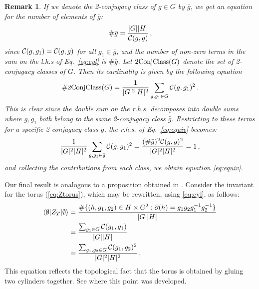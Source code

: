 \documentclass[a4paper,11pt]{article}
\newtheorem{Remark}[Theorem]{Remark}
\begin{document}
\begin{Remark}
If we denote the 2-conjugacy class of $g \in G$ by $\bar g$, we get an equation for the number of elements of $\bar g$:
\begin{equation}
\# \bar{g} = \frac{|G| |H|}{{\cal C}(g,g)} \,,
\end{equation}
since ${\cal C}(g,g_1) = {\cal C}(g,g)$ for all $g_1 \in \bar{g}$, and the number of non-zero terms in the sum on the l.h.s of Eq.~\eqref{eq:cyl} is $\# \bar{g}$.
Let ${\rm 2ConjClass}(G)$ denote the set of 2-conjugacy classes of $G$. Then its cardinality is given by the following equation
\begin{equation}
\label{eq:equiv}
\#{\rm 2ConjClass}(G) = \frac{1}{|G|^2 |H|^2} \sum_{g,g_1 \in G} {\cal C}(g,g_1)^2\,.
\end{equation} 
This is clear since the double sum on the r.h.s. decomposes into double sums where $g,g_1$ both belong to the same 2-conjugacy class $\bar g$. Restricting to these terms for a specific 2-conjugacy class 
$\bar g$, the r.h.s. of Eq.~\eqref{eq:equiv} becomes:
\begin{equation}
\frac{1}{|G|^2 |H|^2}  \sum_{g,g_1 \in \bar g} {\cal C}(g,g_1)^2 = \frac{(\# \bar{g})^2 {\cal C}(g,g)^2}{|G|^2 |H|^2} = 1 \,,
\end{equation}
and collecting the contributions from each class, we obtain equation \eqref{eq:equiv}.


\end{Remark}


Our final result is analogous to a proposition obtained in \cite{bp1}. Consider the invariant for the torus (\ref{eq:Ztorus}), which may be rewritten, using \eqref{eq:cyl}, as follows: 
\begin{align}
\langle \emptyset |Z_T| \emptyset \rangle &= \frac{\#\{(h,g_1,g_2) \in H \times G^2 : \partial(h)=g_1 g_2 g_1^{-1} g_2^{-1}\}}{|G| |H|} \nonumber \\
&= \frac{\sum_{g_1 \in G} {\cal C}(g_1,g_1)}{|G| |H|} \nonumber\\
&= \frac{\sum_{g_1,g_2 \in G} {\cal C}(g_1,g_2)^2}{|G|^2 |H|^2} \, ,
\label{eq:T=2C}
\end{align}
This equation reflects the topological fact that the torus is obtained by gluing two cylinders together. See \cite{bp1} where this point was developed. 
\end{document}
